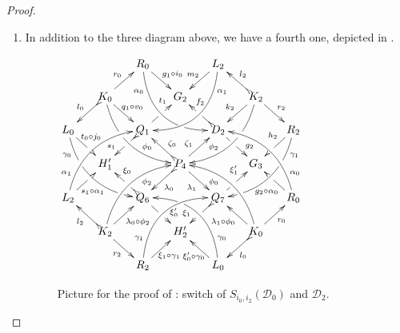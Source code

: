 \documentclass[a4paper,UKenglish,cleveref,pdftex,thm-restate,numberwithinsect,anonymous]{lipics}
\newcommand{\dder}[1]{\mathscr{#1}}
\begin{document}
\begin{proof}
\begin{enumerate}
		\item In addition to the three diagram above, we have a fourth one, depicted in .
		\begin{figure}[h]
			\centering
			$\xymatrix@C=15pt@R=15pt{&&R_0 \ar@/_.8cm/[ddrr]_(.2){\alpha_0}|(.7)\hole \ar[dr]^{\hspace{-1pt}g_1\circ i_0}&& L_2\ar@/^.8cm/[ddll]^(.2){\alpha_1}  \ar[dl]_{m_2\hspace{-2pt}}\\
				&K_0\ar[dr]^{\hspace{-4pt}q_1\circ v_0}\ar@{>->}[dl]_{l_0} \ar@/_.6cm/[ddrr]|(.36)\hole^(.65){\phi_0}\ar[ur]^{r_0}&& G_2 && K_2 \ar@/^.6cm/[ddll]|(.36)\hole_(.65){\phi_2}\ar[dl]_{k_2}\ar@{>->}[lu]_{l_2} \ar[dr]^{r_2}\\
				L_0 \ar@/_.6cm/[ddrr]_(.2){\gamma_0}|(.31)\hole|(.81)\hole \ar[dr]^(.4){\hspace{-4pt}t_0\circ j_0}|(.6)\hole && Q_1 \ar@{>->}[dl]|(.4)\hole_(.65){s_1}\ar[ur]|(.5)\hole^(.7){t_1}&&D_2 \ar[dr]|(.4)\hole^(.65){g_2} \ar@{>->}[ul]|(.5)\hole_(.65){f_2}&&R_2\ar@/^.6cm/[ddll]^(.2){\gamma_1}|(.31)\hole|(.81)\hole\ar[dl]_(.35){h_2}|(.6)\hole\\&H'_1 &&P_4\ar[dr]_{\lambda_1} \ar@{>->}[dl]^{\lambda_0}\ar[ur]^(.4){\zeta_1}\ar@{>->}[ul]_(.4){\zeta_0}&&G_3\\
				L_2 \ar@/^.6cm/[uurr]^(.2){\alpha_1} \ar[ur]_(.35){\hspace{-2pt}s_1\circ
					\alpha_1}|(.61)\hole&&Q_6
				\ar@{>->}[ul]|(.4)\hole_(.6){\xi_0}\ar[dr]|(.5)\hole^(.65){\xi'_0}
				&&Q_7\ar[ur]|(.4)\hole^(.6){\xi'_1}
				\ar@{>->}[dl]|(.5)\hole_(.65){\xi_1} && R_0 \ar[ul]^(.35){g_2\circ
					\alpha_0}|(.61)\hole\ar@/_.6cm/[uull]_(.2){\alpha_0}\\&K_2
				\ar[ur]_{\lambda_0\circ \phi_2} \ar[dr]_{r_2}
				\ar@{>->}[ul]^{l_2}\ar@/^.6cm/[uurr]_(.65){\phi_2}&&H'_2&& K_0
				\ar[ur]_{r_0} \ar[ul]^{\lambda_1\circ \phi_0} \ar@{>->}[dl]^{l_0}
				\ar@/_.6cm/[uull]^(.65){\phi_0}\\&& R_2
				\ar[ur]_{\hspace{-5pt}\xi_1\circ
					\gamma_1}\ar@/^.8cm/[uurr]^(.2){\gamma_1}&& L_0
				\ar[ul]^{\xi'_0\circ \gamma_0\hspace{-7pt}}
				\ar@/_.8cm/[uull]_(.2){\gamma_0} |(.69)\hole 
			}	$
			\caption{Picture for the proof of : switch of $S_{i_0, i_2}(\dder{D}_0)$ and $\dder{D}_2$.}
			\label{fi:fourth}
		\end{figure}
		

\end{enumerate}
\end{proof}
\end{document}
